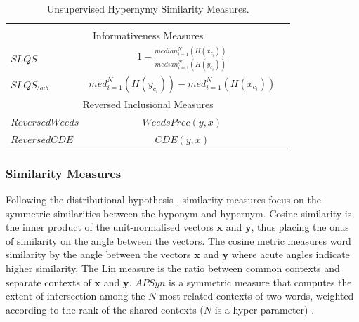 \begin{table}
\begin{tabular}{@{}lcl@{}}
    \citep{lenci2012identifying} \\[2ex]
    \cmidrule{1-3}
    \multicolumn{3}{c}{Informativeness Measures} \\ \cmidrule{1-3}
    $SLQS$                &
    $1-\displaystyle\frac{median_{i=1}^{N}\left( H\left(x_{c_i} \right)\right)}{median_{i=1}^{N}\left( H\left(y_{c_i} \right)\right)}$ & 
    \citep{santus2014chasing} \\[2ex]
    $SLQS_{Sub}$            &
    $med_{i=1}^{N}\left( H\left(y_{c_i} \right)\right) - med_{i=1}^{N}\left( H\left(x_{c_i} \right)\right)$ & 
    \citep{shwartz2017siege} \\[2ex]
    \cmidrule{1-3}
    \multicolumn{3}{c}{Reversed Inclusional Measures} \\ \cmidrule{1-3}
    $Reversed Weeds$      &
    $WeedsPrec(y,x)$& 
    \citep{shwartz2017siege} \\[2ex]
    $Reversed CDE$   &
    $CDE(y,x)$& 
    \citep{shwartz2017siege} \\[2ex]
    \bottomrule
    \end{tabular}
    \caption{Unsupervised Hypernymy Similarity Measures.}\label{tab:unsupervised_measures}
\end{table}


\subsubsection{Similarity Measures}
Following the distributional hypothesis \citep{harris1954distributional}, similarity measures focus on the symmetric similarities between the hyponym and hypernym.  Cosine similarity is the inner product of the unit-normalised vectors $\textbf{x}$ and $\textbf{y}$, thus placing the onus of similarity on the angle between the vectors.   The cosine metric measures word similarity by the angle between the vectors $\textbf{x}$ and $\textbf{y}$ where acute angles indicate higher similarity.  The Lin measure is the ratio between common contexts and separate contexts of $\textbf{x}$ and $\textbf{y}$.  $APSyn$ is a symmetric measure that computes the extent of intersection among the $N$ most related contexts of two words, weighted according to the rank of the shared contexts ($N$ is a hyper-parameter) \citep{santus2016unsupervised}.

